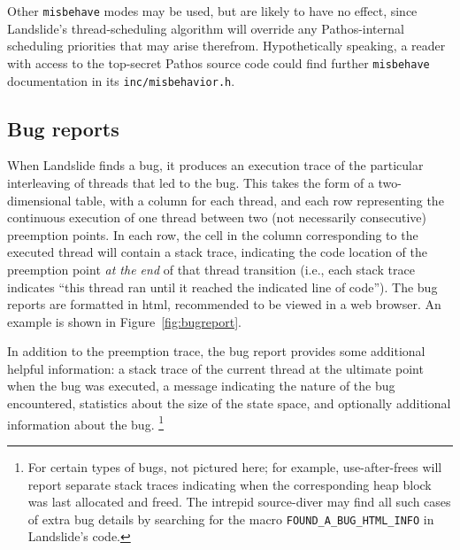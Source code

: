 Other {\tt misbehave} modes may be used, but are likely to have no effect,
since Landslide's thread-scheduling algorithm will override
any Pathos-internal scheduling priorities that may arise therefrom.
Hypothetically speaking, a reader with access to the top-secret Pathos source code
could find further {\tt misbehave} documentation in its {\tt inc/misbehavior.h}.


\subsection{Bug reports}
\label{sec:landslide-bugreport}

When Landslide finds a bug, it produces an execution trace of the particular interleaving of threads that led to the bug.
This takes the form of a two-dimensional table,
with a column for each thread,
and each row representing the continuous execution of one thread between two (not necessarily consecutive) preemption points.
In each row, the cell in the column corresponding to the executed thread will contain a stack trace,
indicating the code location of the preemption point {\em at the end} of that thread transition
(i.e., each stack trace indicates ``this thread ran until it reached the indicated line of code'').
The bug reports are formatted in html, recommended to be viewed in a web browser.
An example is shown in Figure~\ref{fig:bugreport}.

In addition to the preemption trace, the bug report provides some additional helpful information:
a stack trace of the current thread at the ultimate point when the bug was executed,
a message indicating the nature of the bug encountered,
statistics about the size of the state space,
and optionally additional information about the bug.%
\footnote{For certain types of bugs, not pictured here;
for example, use-after-frees will report separate stack traces
indicating when the corresponding heap block was last allocated and freed.
The intrepid source-diver may find all such cases of extra bug details
by searching for the macro {\tt FOUND\_A\_BUG\_HTML\_INFO} in Landslide's code.}

